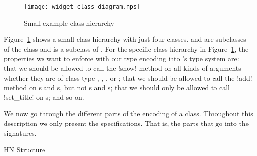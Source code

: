 \documentclass[workingdraft]{usetex-v1}
\begin{document}
\begin{figure}[htp]
  \centering
  \texttt{[image: widget-class-diagram.mps]}
  \caption{Small example class hierarchy}
  \label{fig:class-hierarchy}
\end{figure}

Figure~\ref{fig:class-hierarchy} shows a small class hierarchy with
just four classes.  and  are
subclasses of the class  and  is a
subclass of .  For the specific class hierarchy
in Figure~\ref{fig:class-hierarchy}, the properties we want to enforce
with our type encoding into \sml's type system are: that we should be
allowed to call the !show! method on all kinds of arguments whether
they are of class type , ,
, or ; that we should be
allowed to call the !add! method on s and
s, but not s and
s; that we should only be allowed to call !set_title!
on s; and so on.

We now go through the different parts of the encoding of a class.
Throughout this description we only present the \sml specifications.
That is, the parts that go into the signatures.

\begin{ednote}{HN} Structure \end{ednote}
\end{document}
